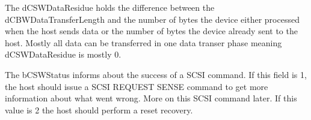 The dCSWDataResidue holds the difference between the dCBWDataTransferLength and the number of bytes the device either processed when the host sends data or the number of bytes the device already sent to the host. Mostly all data can be transferred in one data transer phase meaning dCSWDataResidue is mostly 0.

The bCSWStatus informs about the success of a SCSI command. If this field is 1, the host should issue a SCSI REQUEST SENSE command to get more information about what went wrong\cite{usb_ms_jan}. More on this SCSI command later. If this value is 2 the host should perform a reset recovery. 
